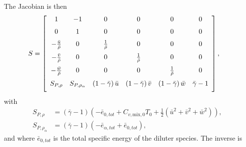 The Jacobian is then
\begin{align}
S &= 
\left[\begin{array}{cccccc}
    1      %
  & -1     %
  & 0      %
  & 0      %
  & 0      %
  & 0      %
  \\ \noalign{\medskip}
    0      %
  & 1      %
  & 0      %
  & 0      %
  & 0      %
  & 0      %
  \\ \noalign{\medskip}
    - \frac{\bar{u}}{\bar{\rho}}     %
  & 0                                %
  & \frac{1}{\bar{\rho}}             %
  & 0                                %
  & 0                                %
  & 0                                %
  \\ \noalign{\medskip}
    - \frac{\bar{v}}{\bar{\rho}}     %
  & 0                                %
  & 0                                %
  & \frac{1}{\bar{\rho}}             %
  & 0                                %
  & 0                                %
  \\ \noalign{\medskip}
    - \frac{\bar{w}}{\bar{\rho}}     %
  & 0                                %
  & 0                                %
  & 0                                %
  & \frac{1}{\bar{\rho}}             %
  & 0                                %
  \\ \noalign{\medskip}
     S_{P,\rho}                                 %
  &  S_{P,\rho_\alpha}                          %
  & \left(1 - \bar{\gamma}\right) \bar{u}       %
  & \left(1 - \bar{\gamma}\right) \bar{v}       %
  & \left(1 - \bar{\gamma}\right) \bar{w}       %
  & \bar{\gamma}-1                              %
  \\ \noalign{\medskip}
\end{array}\right]
,
\end{align}
%
with
\begin{align}
S_{P,\rho} &= 
\left(\bar{\gamma} - 1\right) 
    \left(-\bar{e}_{0,tot} + C_{v,\text{mix},0} T_0 +
    \frac{1}{2} \left(\bar{u}^2 + \bar{v}^2 + \bar{w}^2\right)
    \right), \\
S_{P,\rho_\alpha} &= 
\left(\bar{\gamma} - 1\right) \left(-\bar{e}_{\alpha,tot}+\bar{e}_{0,tot}\right),
\end{align}
and where $\bar{e}_{0,tot}$ is the total specific energy of the diluter species.
The inverse is

